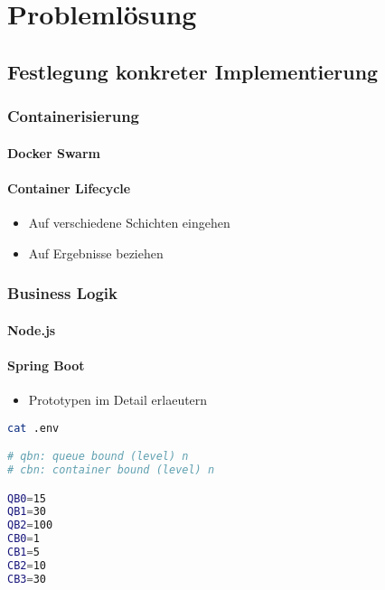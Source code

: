 \chapter{Probleml\"osung}

\section{Festlegung konkreter Implementierung}
\subsection{Containerisierung}
\subsubsection{Docker Swarm}
\subsubsection{Container Lifecycle}
\begin{itemize}
  \item Auf verschiedene Schichten eingehen
  \item Auf Ergebnisse beziehen
\end{itemize}

\subsection{Business Logik}
\subsubsection{Node.js}
\subsubsection{Spring Boot}


\begin{itemize}
  \item Prototypen im Detail erlaeutern
\end{itemize}


\renewcommand\theadalign{bc}
\renewcommand\theadfont{\bfseries}
\renewcommand\theadgape{\Gape[4pt]}
\renewcommand\cellgape{\Gape[4pt]}


\begin{lstlisting}[language=bash]
cat .env

# qbn: queue bound (level) n
# cbn: container bound (level) n

QB0=15
QB1=30
QB2=100
CB0=1
CB1=5
CB2=10
CB3=30
\end{lstlisting}


